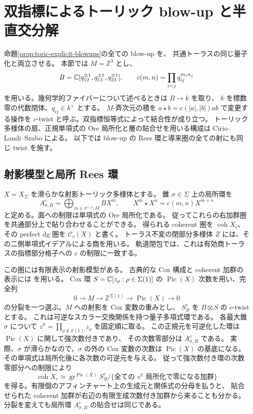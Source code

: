 \section{双指標によるトーリック blow-up と半直交分解}
\label{sec:toric-nc-blowups}

命題\ref{prop:toric-explicit-blowups}の全ての blow-up を、
共通トーラスの同じ量子化と両立させる。
本節では $M=\mathbb Z^3$ とし、
\[
 B=\mathbb C[q_{12}^{\pm1},q_{13}^{\pm1},q_{23}^{\pm1}],
 \qquad
 c(m,n)=\prod_{i<j}q_{ij}^{m_i n_j}
\]
を用いる。幾何学的ファイバーについて述べるときは $B\to k$ を取り、
$k$ を標数零の代数閉体、$q_{ij}\in k^\times$ とする。
$M$-斉次元の積を $a\star b=c(|a|,|b|)ab$ で変更する操作を
$c$-twist と呼ぶ。双指標恒等式によって結合性が成り立つ。
トーリック多様体の扇、正規単項式の Ore 局所化と層の貼合せを用いる構成は
Cirio--Landi--Szabo \cite[\S\S3--4]{ToricCLS} による。
以下では blow-up の Rees 環と導来圏の全ての射にも同じ twist を施す。

\subsection{射影模型と局所 Rees 環}

$X=X_\Sigma$ を滑らかな射影トーリック多様体とする。
錐 $\sigma\in\Sigma$ 上の局所環を
\[
 A_{\sigma,B}^c
 =\bigoplus_{m\in\sigma^\vee\cap M}B X^m,
 \qquad X^m\star X^n=c(m,n)X^{m+n}
\]
と定める。面への制限は単項式の Ore 局所化である。
従ってこれらの右加群圏を共通部分上で貼り合わせることができる。
得られる coherent 圏を $\operatorname{coh}X_c$、
その perfect dg 圏を $\mathcal C_c(X)$ と書く。
トーラス不変の閉部分多様体 $Z$ には、その二側単項式イデアルによる商を用いる。
軌道閉包では、これは有効商トーラスの指標部分格子への $c$ の制限に一致する。

この圏には有限表示の射影模型がある。
古典的な Cox 構成と coherent 加群の表示には
\cite[補題2.2、定理3.2、命題3.3]{ToricCox} を用いる。
Cox 環 $S=\mathbb C[z_\rho:\rho\in\Sigma(1)]$ の
$\operatorname{Pic}(X)$ 次数を用い、完全列
\[
 0\longrightarrow M\longrightarrow
 \mathbb Z^{\Sigma(1)}
 \longrightarrow\operatorname{Pic}(X)\longrightarrow0
\]
の分裂を一つ選ぶ。$M$ への射影を Cox 変数の重みとし、
$S_B^c$ を $B\otimes S$ の $c$-twist とする。
これは可逆なスカラー交換関係を持つ量子多項式環である。
各最大錐 $\sigma$ について
$z^{\widehat\sigma}=\prod_{\rho\notin\sigma(1)}z_\rho$ を固定順に取る。
この正規元を可逆化した環は $\operatorname{Pic}(X)$ に関して強次数付きであり、
その次数零部分は $A_{\sigma,B}^c$ である。
実際、$\sigma$ が滑らかなので、$\sigma$ の外の Cox 変数の次数は
$\operatorname{Pic}(X)$ の基底になる。
その単項式は局所化後に各次数の可逆元を与える。
従って強次数付き環の次数零部分への制限により
\[
 \operatorname{coh}X_c
 \simeq
 \operatorname{gr}^{\operatorname{Pic}(X)}S_B^c/
 \{\text{全ての }z^{\widehat\sigma}\text{ 局所化で零になる加群}\}
 \tag{TNC1}
\]
を得る。有限個のアフィンチャート上の生成元と関係式の分母を払うと、
貼合せられた coherent 加群が右辺の有限生成次数付き加群から来ることも分かる。
分裂を変えても局所環 $A_{\sigma,B}^c$ の貼合せは同じである。

